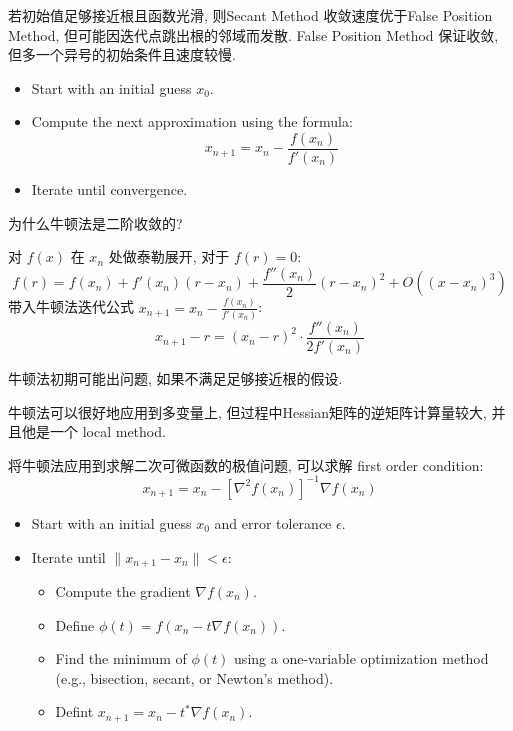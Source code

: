 \begin{note}
若初始值足够接近根且函数光滑, 则Secant Method 收敛速度优于False Position Method, 但可能因迭代点跳出根的邻域而发散. False Position Method 保证收敛, 但多一个异号的初始条件且速度较慢.
\end{note}
\begin{definition}
    \begin{itemize}
        \item Start with an initial guess $x_0$.
        \item Compute the next approximation using the formula:
        $$x_{n+1} = x_n - \frac{f(x_n)}{f'(x_n)}$$
        \item Iterate until convergence.
    \end{itemize}
\end{definition}
\begin{problem}
为什么牛顿法是二阶收敛的?
\end{problem}
\begin{solution}
对 $f(x)$ 在 $x_n$ 处做泰勒展开, 对于 $f(r)=0$:
$$f(r) = f(x_n) + f'(x_n)(r - x_n) + \frac{f''(x_n)}{2}(r - x_n)^2 + O((x - x_n)^3)$$
带入牛顿法迭代公式 $x_{n+1} = x_n - \frac{f(x_n)}{f'(x_n)}$:
$$x_{n+1} - r = (x_n - r)^2 \cdot \frac{f''(x_n)}{2f'(x_n)} $$
\end{solution}
\begin{note}
牛顿法初期可能出问题, 如果不满足足够接近根的假设.

牛顿法可以很好地应用到多变量上, 但过程中Hessian矩阵的逆矩阵计算量较大, 并且他是一个 local method.
\end{note}
\begin{example}
    将牛顿法应用到求解二次可微函数的极值问题, 可以求解 first order condition:
    $$ x_{n+1} = x_n - [\nabla^2 f(x_n)]^{-1} \nabla f(x_n) $$
\end{example}

\begin{definition}
    \begin{itemize}
        \item Start with an initial guess $x_0$ and error tolerance $\epsilon$.
        \item Iterate until $\|x_{n+1} - x_n\| < \epsilon$:
        \begin{itemize}
            \item Compute the gradient $\nabla f(x_n)$.
            \item Define $\phi(t) = f(x_n - t \nabla f(x_n))$.
            \item Find the minimum of $\phi(t)$ using a one-variable optimization method (e.g., bisection, secant, or Newton's method).
            \item Defint $x_{n+1} = x_n - t^* \nabla f(x_n)$.
        \end{itemize}
    \end{itemize}
\end{definition}

%








